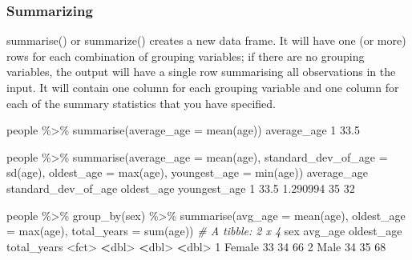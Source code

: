 \documentclass[
]{book}
\newenvironment{Shaded}{\begin{snugshade}}{\end{snugshade}}
\newcommand{\AttributeTok}[1]{\textcolor[rgb]{0.77,0.63,0.00}{#1}}
\newcommand{\CommentTok}[1]{\textcolor[rgb]{0.56,0.35,0.01}{\textit{#1}}}
\newcommand{\DecValTok}[1]{\textcolor[rgb]{0.00,0.00,0.81}{#1}}
\newcommand{\ErrorTok}[1]{\textcolor[rgb]{0.64,0.00,0.00}{\textbf{#1}}}
\newcommand{\FloatTok}[1]{\textcolor[rgb]{0.00,0.00,0.81}{#1}}
\newcommand{\FunctionTok}[1]{\textcolor[rgb]{0.00,0.00,0.00}{#1}}
\newcommand{\NormalTok}[1]{#1}
\newcommand{\SpecialCharTok}[1]{\textcolor[rgb]{0.00,0.00,0.00}{#1}}
\begin{document}
\hypertarget{summarizing-1}{%
\subsubsection*{Summarizing}\label{summarizing-1}}

summarise() or summarize() creates a new data frame. It will have one (or more) rows for each combination of grouping variables; if there are no grouping variables, the output will have a single row summarising all observations in the input. It will contain one column for each grouping variable and one column for each of the summary statistics that you have specified.

\begin{Shaded}
\begin{Highlighting}[]
\NormalTok{people }\SpecialCharTok{\%\textgreater{}\%} 
  \FunctionTok{summarise}\NormalTok{(}\AttributeTok{average\_age =} \FunctionTok{mean}\NormalTok{(age))}
\NormalTok{  average\_age}
\DecValTok{1}        \FloatTok{33.5}

\NormalTok{people }\SpecialCharTok{\%\textgreater{}\%} 
  \FunctionTok{summarise}\NormalTok{(}\AttributeTok{average\_age =} \FunctionTok{mean}\NormalTok{(age),}
            \AttributeTok{standard\_dev\_of\_age =} \FunctionTok{sd}\NormalTok{(age),}
            \AttributeTok{oldest\_age =} \FunctionTok{max}\NormalTok{(age),}
            \AttributeTok{youngest\_age =} \FunctionTok{min}\NormalTok{(age))}
\NormalTok{  average\_age standard\_dev\_of\_age oldest\_age youngest\_age}
\DecValTok{1}        \FloatTok{33.5}            \FloatTok{1.290994}         \DecValTok{35}           \DecValTok{32}

\NormalTok{people }\SpecialCharTok{\%\textgreater{}\%} 
  \FunctionTok{group\_by}\NormalTok{(sex) }\SpecialCharTok{\%\textgreater{}\%}
  \FunctionTok{summarise}\NormalTok{(}\AttributeTok{avg\_age =} \FunctionTok{mean}\NormalTok{(age),}
            \AttributeTok{oldest\_age =} \FunctionTok{max}\NormalTok{(age),}
            \AttributeTok{total\_years =} \FunctionTok{sum}\NormalTok{(age)) }
\CommentTok{\# A tibble: 2 x 4}
\NormalTok{  sex    avg\_age oldest\_age total\_years}
  \SpecialCharTok{\textless{}}\NormalTok{fct}\SpecialCharTok{\textgreater{}}    \ErrorTok{\textless{}}\NormalTok{dbl}\SpecialCharTok{\textgreater{}}      \ErrorTok{\textless{}}\NormalTok{dbl}\SpecialCharTok{\textgreater{}}       \ErrorTok{\textless{}}\NormalTok{dbl}\SpecialCharTok{\textgreater{}}
\DecValTok{1}\NormalTok{ Female      }\DecValTok{33}         \DecValTok{34}          \DecValTok{66}
\DecValTok{2}\NormalTok{ Male        }\DecValTok{34}         \DecValTok{35}          \DecValTok{68}


\end{Highlighting}
\end{Shaded}
\end{document}

